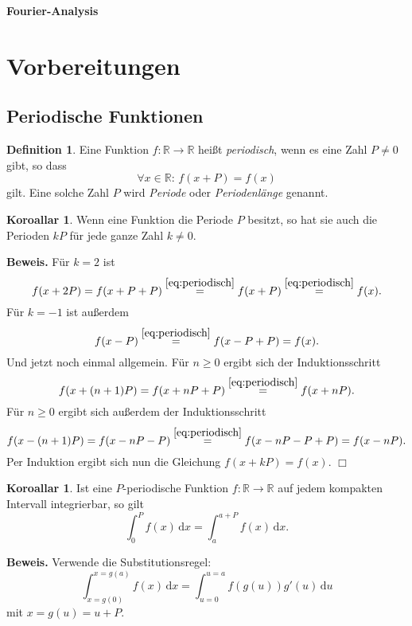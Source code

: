 \documentclass[a4paper,12pt,fleqn,twoside]{article}
\newcommand{\R}{\mathbb R}
\newcommand{\emdef}[1]{\emph{#1}}
\theoremstyle{definition}
\newtheorem{Definition}{Definition}
\theoremstyle{theorem}
\newtheorem{Korollar}[Satz]{Koroallar}
\begin{document}
\phantom{x}
\vspace{2em}
{\center\LARGE\bfseries Fourier-Analysis\par}

\tableofcontents

\section{Vorbereitungen}
\subsection{Periodische Funktionen}

\begin{Definition}
Eine Funktion $f\colon\R\to\R$ heißt \emdef{periodisch}, wenn es eine
Zahl $P\ne 0$ gibt, so dass
\begin{equation}\label{eq:periodisch}
\forall x\in\R\colon\, f(x+P)=f(x)
\end{equation}
gilt. Eine solche Zahl $P$ wird \emdef{Periode} oder
\emdef{Periodenlänge} genannt.
\end{Definition}

\begin{Korollar}
Wenn eine Funktion die Periode $P$ besitzt, so hat sie auch die
Perioden $kP$ für jede ganze Zahl $k\ne 0$.
\end{Korollar}
\noindent
\textbf{Beweis.} Für $k=2$ ist
\begin{equation}
f(x+2P) = f(x+P+P) \stackrel{\eqref{eq:periodisch}}=
f(x+P) \stackrel{\eqref{eq:periodisch}}= f(x).
\end{equation}
Für $k=-1$ ist außerdem
\begin{equation}
f(x-P) \stackrel{\eqref{eq:periodisch}}= f(x-P+P) = f(x).
\end{equation}
Und jetzt noch einmal allgemein. Für $n\ge 0$ ergibt sich der
Induktionsschritt
\begin{equation}
f(x+(n+1)P) = f(x+nP+P) \stackrel{\eqref{eq:periodisch}}= f(x+nP).
\end{equation}
Für $n\ge 0$ ergibt sich außerdem der Induktionsschritt
\begin{equation}
f(x-(n+1)P) = f(x-nP-P) \stackrel{\eqref{eq:periodisch}}=
f(x-nP-P+P) = f(x-nP).
\end{equation}
Per Induktion ergibt sich nun die Gleichung $f(x+kP) = f(x)$. $\Box$

\begin{Korollar}
Ist eine $P$-periodische Funktion $f\colon\R\to\R$ auf jedem
kompakten Intervall integrierbar, so gilt
\begin{equation}
\int_0^P f(x)\,\mathrm dx = \int_a^{a+P} f(x)\,\mathrm dx.
\end{equation}
\end{Korollar}
\noindent
\textbf{Beweis.} Verwende die Substitutionsregel:
\begin{equation}
\int_{x=g(0)}^{x=g(a)} f(x)\,\mathrm dx = \int_{u=0}^{u=a}
f(g(u))g'(u)\,\mathrm du
\end{equation}
mit $x=g(u)=u+P$.
\end{document}
